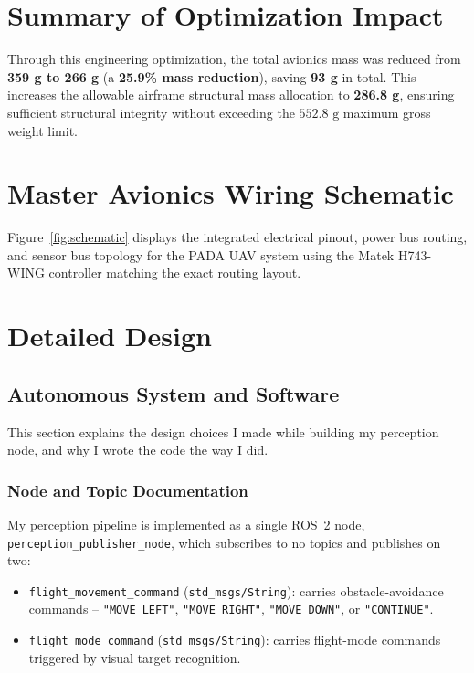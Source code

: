 \documentclass[12pt,a4paper]{article}
\begin{document}
\section{Summary of Optimization Impact}
Through this engineering optimization, the total avionics mass was reduced from \textbf{359 g to 266 g} (a \textbf{25.9\% mass reduction}), saving \textbf{93 g} in total. This increases the allowable airframe structural mass allocation to \textbf{286.8 g}, ensuring sufficient structural integrity without exceeding the $552.8\text{ g}$ maximum gross weight limit.

\section{Master Avionics Wiring Schematic}
Figure~\ref{fig:schematic} displays the integrated electrical pinout, power bus routing, and sensor bus topology for the PADA UAV system using the Matek H743-WING controller matching the exact routing layout.



\newpage

\section{Detailed Design}

\subsection{Autonomous System and Software}

This section explains the design choices I made while building my
perception node, and why I wrote the code the way I did.

\subsubsection{Node and Topic Documentation}
My perception pipeline is implemented as a single ROS~2 node,
\texttt{perception\_publisher\_node}, which subscribes to no topics and
publishes on two:

\begin{itemize}
    \item \texttt{flight\_movement\_command} (\texttt{std\_msgs/String}):
    carries obstacle-avoidance commands -- \texttt{"MOVE LEFT"},
    \texttt{"MOVE RIGHT"}, \texttt{"MOVE DOWN"}, or \texttt{"CONTINUE"}.
    \item \texttt{flight\_mode\_command} (\texttt{std\_msgs/String}):
    carries flight-mode commands triggered by visual target recognition.
\end{itemize}
\end{document}
